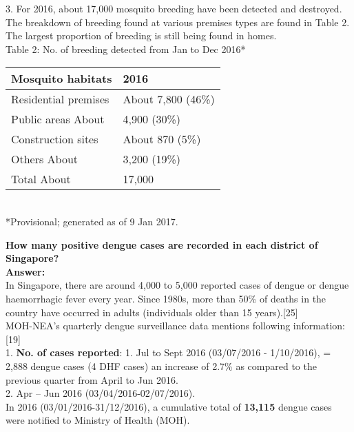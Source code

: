 \documentclass[11pt]{exam}
\begin{document}
\begin{questions}
3. For 2016, about 17,000 mosquito breeding have been detected and destroyed. The breakdown of
breeding found at various premises types are found in Table 2. 
The largest proportion of breeding is still being found in homes.\\
Table 2: No. of breeding detected from Jan to Dec 2016* \\
\begin{tabular}{ |p{5cm}|p{5cm}| }
\hline
Mosquito habitats & 2016  \\
\hline
Residential premises & About 7,800 (46\%)\\
Public areas About & 4,900 (30\%)\\
Construction sites & About 870 (5\%)\\
Others About & 3,200 (19\%)\\
Total About & 17,000\\
\hline
\end{tabular} \\ 

*Provisional; generated as of 9 Jan 2017.

%    

\question
\label{17. Dengue: Number of positive dengue cases}
\textbf{How many positive dengue cases are recorded in each district of Singapore?} \\
\textbf{Answer:}\\
In Singapore, there are around 4,000 to 5,000 reported cases of dengue or dengue haemorrhagic fever every year. Since 1980s, more than 50\% of deaths in the country have occurred in adults (individuals older than 15 years).[25]\\
MOH-NEA's quarterly dengue surveillance data mentions following information:[19]\\
1. \textbf{No. of cases reported}: 1. Jul to Sept 2016 (03/07/2016 - 1/10/2016), = 2,888 dengue cases (4 DHF cases) an increase of 2.7\% as compared to the previous quarter from April to Jun 2016. \\
                          2. Apr – Jun 2016 (03/04/2016-02/07/2016). \\
In 2016 (03/01/2016-31/12/2016), a cumulative total of \textbf{13,115} dengue
cases were notified to Ministry of Health (MOH).\\ 


\end{questions}
\end{document}
